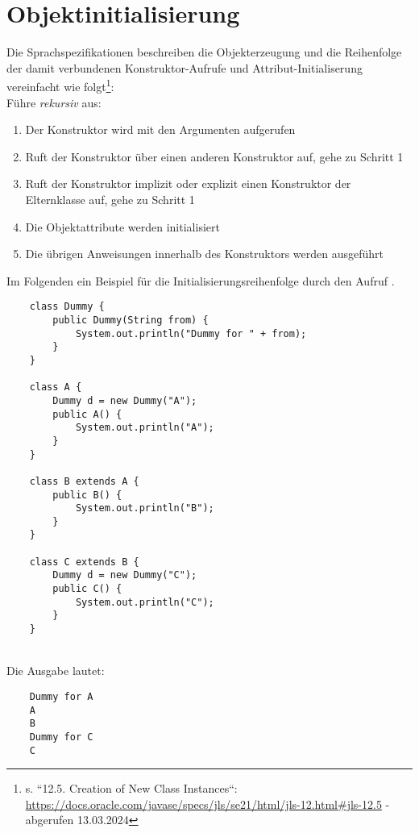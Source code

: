 \section{Objektinitialisierung}

Die Sprachspezifikationen beschreiben die Objekterzeugung und die Reihenfolge der damit verbundenen Konstruktor-Aufrufe und Attribut-Initialiserung vereinfacht wie folgt\footnote{
s. ``12.5. Creation of New Class Instances``: \url{https://docs.oracle.com/javase/specs/jls/se21/html/jls-12.html#jls-12.5} - abgerufen 13.03.2024
}:\\

\noindent
Führe \textit{rekursiv} aus:\\

\begin{enumerate}
    \item Der Konstruktor wird mit den Argumenten aufgerufen
    \item Ruft der Konstruktor über  einen anderen Konstruktor auf, gehe zu Schritt 1
    \item Ruft der Konstruktor implizit oder explizit einen Konstruktor der Elternklasse auf, gehe zu Schritt 1
    \item Die Objektattribute werden initialisiert
    \item Die übrigen Anweisungen innerhalb des Konstruktors werden ausgeführt
\end{enumerate}

\noindent
Im Folgenden ein Beispiel für die Initialisierungsreihenfolge durch den Aufruf .\\

\begin{verbatim}
    class Dummy {
        public Dummy(String from) {
            System.out.println("Dummy for " + from);
        }
    }

    class A {
        Dummy d = new Dummy("A");
        public A() {
            System.out.println("A");
        }
    }

    class B extends A {
        public B() {
            System.out.println("B");
        }
    }

    class C extends B {
        Dummy d = new Dummy("C");
        public C() {
            System.out.println("C");
        }
    }
\end{verbatim}\\

\noindent
Die Ausgabe lautet:


\begin{verbatim}
    Dummy for A
    A
    B
    Dummy for C
    C
\end{verbatim}
